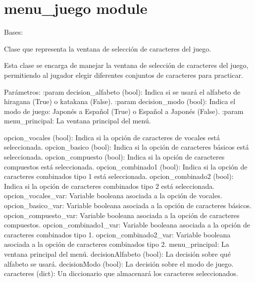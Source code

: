 \documentclass[letterpaper,10pt,spanish]{sphinxmanual}
\begin{document}
\chapter{menu\_juego module}
\label{\detokenize{menu_juego:module-menu_juego}}\label{\detokenize{menu_juego:menu-juego-module}}\label{\detokenize{menu_juego::doc}}

\begin{fulllineitems}
\label{\detokenize{menu_juego:menu_juego.CaracteresSelector}}
\pysigstartsignatures
{}
\pysigstopsignatures
\sphinxAtStartPar
Bases: 

\sphinxAtStartPar
Clase que representa la ventana de selección de caracteres del juego.

\sphinxAtStartPar
Esta clase se encarga de manejar la ventana de selección de caracteres del juego, permitiendo al jugador
elegir diferentes conjuntos de caracteres para practicar.

\sphinxAtStartPar
Parámetros:
:param decision\_alfabeto (bool): Indica si se usará el alfabeto de hiragana (True) o katakana (False).
:param decision\_modo (bool): Indica el modo de juego: Japonés a Español (True) o Español a Japonés (False).
:param menu\_principal: La ventana principal del menú.
\begin{description}
\sphinxAtStartPar
opcion\_vocales (bool): Indica si la opción de caracteres de vocales está seleccionada.
opcion\_basico (bool): Indica si la opción de caracteres básicos está seleccionada.
opcion\_compuesto (bool): Indica si la opción de caracteres compuestos está seleccionada.
opcion\_combinado1 (bool): Indica si la opción de caracteres combinados tipo 1 está seleccionada.
opcion\_combinado2 (bool): Indica si la opción de caracteres combinados tipo 2 está seleccionada.
opcion\_vocales\_var: Variable booleana asociada a la opción de vocales.
opcion\_basico\_var: Variable booleana asociada a la opción de caracteres básicos.
opcion\_compuesto\_var: Variable booleana asociada a la opción de caracteres compuestos.
opcion\_combinado1\_var: Variable booleana asociada a la opción de caracteres combinados tipo 1.
opcion\_combinado2\_var: Variable booleana asociada a la opción de caracteres combinados tipo 2.
menu\_principal: La ventana principal del menú.
decisionAlfabeto (bool): La decisión sobre qué alfabeto se usará.
decisionModo (bool): La decisión sobre el modo de juego.
caracteres (dict): Un diccionario que almacenará los caracteres seleccionados.


\end{description}
\end{fulllineitems}
\end{document}
